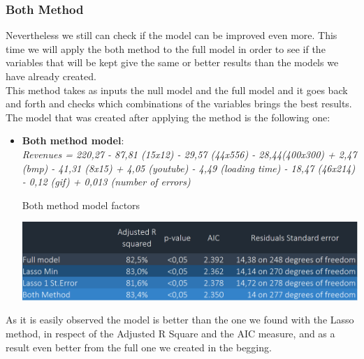 \documentclass{book}
\begin{document}
\subsubsection{Both Method}
Nevertheless we still can check if the model can be improved even more. This time we will apply the both method to the full model in order to see if the variables that will be kept give the same or better results than the models we have already created.\\
This method takes as inputs the null model and the full model and it goes back and forth and checks which combinations of the variables brings the best results. The model that was created after applying the method is the following one:\\
\begin{itemize}
\item \textbf{Both method model}:\\
\textit{Revenues = 220,27 - 87,81 (15x12) - 29,57 (44x556) - 28,44(400x300) + 2,47 (bmp) - 41,31 (8x15) + 4,05 (youtube) - 4,49 (loading time) - 18,47 (46x214) - 0,12 (gif) + 0,013 (number of errors)}
\begin{table}[H]
\centering
\caption{Both method model factors}
\includegraphics[scale=0.6]{../R/photos/0001_f_f3_f4_ma.PNG} 
\end{table}
\end{itemize}
As it is easily observed the model is better than the one we found with the Lasso method, in respect of the Adjusted R Square and the AIC measure, and as a result even better from the full one we created in the begging.
\end{document}
